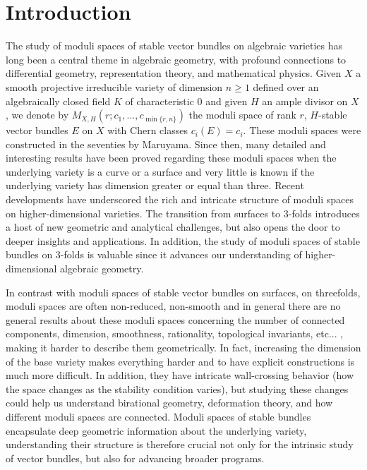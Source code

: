 \documentclass[11pt,twoside]{amsart}
\theoremstyle{definition}
\begin{document}
\section{Introduction}
The study of moduli spaces of stable vector bundles on algebraic varieties has long been a central theme in algebraic geometry, with profound connections to differential geometry, representation theory, and mathematical physics. Given $X$ a smooth projective irreducible variety of dimension $n\geq 1$ defined over an algebraically closed field $K$ of characteristic $0$ and given $H$ an ample divisor on $X$, we denote by $M_{X,H}(r;c_1, \dots, c_{\min \{r,n \}}) $ the moduli space of rank  $r$, $H$-stable  vector bundles $E$ on $X$ with Chern classes $c_i(E)=c_i$. These moduli spaces were constructed in the seventies by Maruyama. Since then,  many detailed and interesting results
have been proved regarding these moduli spaces when the underlying variety is a curve or 
a surface and very little is known if the underlying variety has dimension greater or equal
than three. Recent developments have underscored the rich and intricate structure of moduli spaces on higher-dimensional varieties. The transition from surfaces to 3-folds introduces a host of new geometric and analytical challenges, but also opens the door to deeper insights and applications. In addition, the study of moduli spaces of stable bundles on 3-folds is valuable since it advances our understanding of higher-dimensional algebraic geometry.

In contrast with moduli spaces of stable vector bundles on surfaces, on threefolds, moduli spaces are often non-reduced,  non-smooth and in general there are no general results about these moduli spaces concerning the number of connected components, dimension, smoothness, rationality,
topological invariants, etc... , making it harder to describe them geometrically. In fact, increasing the dimension of the base variety makes everything harder and to have explicit constructions is much more difficult. In addition,  they have intricate wall-crossing behavior (how the space changes as the stability condition varies), but studying these changes could help us understand birational geometry, deformation theory, and how different moduli spaces are connected. 
 Moduli spaces of stable bundles encapsulate deep geometric information about the underlying variety, understanding their structure is therefore crucial not only for the intrinsic study of vector bundles, but also for advancing broader programs. 
\end{document}
